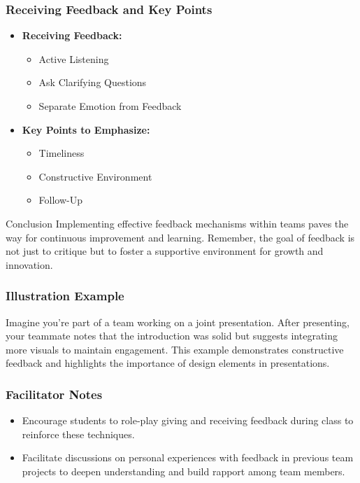 \documentclass[aspectratio=169]{beamer}
\begin{document}
\begin{frame}[fragile]
    \frametitle{Receiving Feedback and Key Points}
    \begin{itemize}
        \item \textbf{Receiving Feedback:}
        \begin{itemize}
            \item Active Listening
            \item Ask Clarifying Questions
            \item Separate Emotion from Feedback
        \end{itemize}

        \item \textbf{Key Points to Emphasize:}
        \begin{itemize}
            \item Timeliness
            \item Constructive Environment
            \item Follow-Up
        \end{itemize}
    \end{itemize}
    
    \begin{block}{Conclusion}
        Implementing effective feedback mechanisms within teams paves the way for continuous improvement and learning. Remember, the goal of feedback is not just to critique but to foster a supportive environment for growth and innovation.
    \end{block}
\end{frame}

\begin{frame}[fragile]
    \frametitle{Illustration Example}
    Imagine you’re part of a team working on a joint presentation. After presenting, your teammate notes that the introduction was solid but suggests integrating more visuals to maintain engagement. 
    This example demonstrates constructive feedback and highlights the importance of design elements in presentations.
\end{frame}

\begin{frame}[fragile]
    \frametitle{Facilitator Notes}
    \begin{itemize}
        \item Encourage students to role-play giving and receiving feedback during class to reinforce these techniques.
        \item Facilitate discussions on personal experiences with feedback in previous team projects to deepen understanding and build rapport among team members.
    \end{itemize}
\end{frame}
\end{document}
